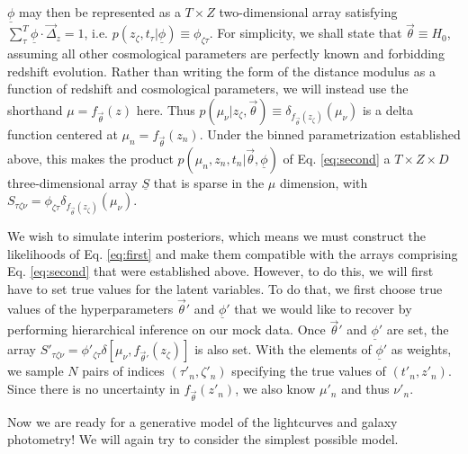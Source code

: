 \documentclass[12pt, onecolumn]{emulateapj}
\newcommand{\textul}{\underline}
\begin{document}
$\textul{\phi}$ may then be represented as a $T\times Z$ two-dimensional array satisfying $\sum_{\tau}^{T}\textul{\phi}\cdot\vec{\Delta}_{z}=1$, i.e. $p(z_{\zeta}, t_{\tau} | \textul{\phi}) \equiv \phi_{\zeta\tau}$.  For simplicity, we shall state that $\vec{\theta}\equiv H_{0}$, assuming all other cosmological parameters are perfectly known and forbidding redshift evolution.  Rather than writing the form of the distance modulus as a function of redshift and cosmological parameters, we will instead use the shorthand $\mu = f_{\vec{\theta}}(z)$ here.  Thus $p(\mu_{\nu} | z_{\zeta}, \vec{\theta}) \equiv \delta_{f_{\vec{\theta}}(z_{\zeta})}(\mu_{\nu})$ is a delta function centered at $\mu_{n} = f_{\vec{\theta}}(z_{n})$.  Under the binned parametrization established above, this makes the product $p(\mu_{n}, z_{n}, t_{n} | \vec{\theta}, \textul{\phi})$ of Eq. \ref{eq:second} a $T\times Z\times D$ three-dimensional array $\textul{S}$ that is sparse in the $\mu$ dimension, with $S_{\tau\zeta\nu}=\phi_{\zeta\tau}\delta_{f_{\vec{\theta}}(z_{\zeta})}(\mu_{\nu})$.

We wish to simulate interim posteriors, which means we must construct the likelihoods of Eq. \ref{eq:first} and make them compatible with the arrays comprising Eq. \ref{eq:second} that were established above.  However, to do this, we will first have to set true values for the latent variables.  To do that, we first choose true values of the hyperparameters $\vec{\theta}'$ and $\textul{\phi}'$ that we would like to recover by performing hierarchical inference on our mock data.  Once $\vec{\theta}'$ and $\textul{\phi}'$ are set, the array $S'_{\tau\zeta\nu}=\phi'_{\zeta\tau}\delta[\mu_{\nu}, f_{\vec{\theta}'}(z_{\zeta})]$ is also set.  With the elements of $\textul{\phi}'$ as weights, we sample $N$ pairs of indices $(\tau'_{n}, \zeta'_{n})$ specifying the true values of $(t'_{n}, z'_{n})$.  Since there is no uncertainty in $f_{\vec{\theta}}(z'_{n})$, we also know $\mu'_{n}$ and thus $\nu'_{n}$.  

Now we are ready for a generative model of the lightcurves and galaxy photometry!  We will again try to consider the simplest possible model.  
\end{document}
